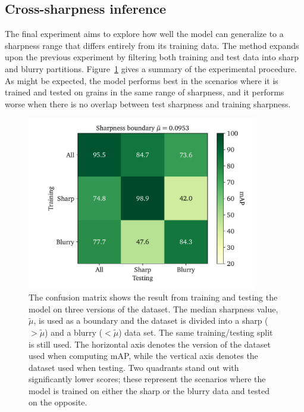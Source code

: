 \subsection{Cross-sharpness inference}
The final experiment aims to explore how well the model can generalize to a sharpness range that differs entirely from its training data. The method expands upon the previous experiment by filtering both training and test data into sharp and blurry partitions.
Figure~\ref{fig:results-sharpness-inference} gives a summary of the experimental procedure.
As might be expected, the model performs best in the scenarios where it is trained and tested on grains in the same range of sharpness, and it performs worse when there is no overlap between test sharpness and training sharpness.

\begin{figure}[htbp]
  \centering
  \includegraphics[width=0.9\textwidth]{figs/results/sharpness/confustion_balanced_test_map.pdf}
  \caption[mAP across sharpness boundary]{%
The confusion matrix shows the result from training and testing the model on three versions of the dataset.
The median sharpness value, \(\tilde{\mu}\), is used as a boundary and the dataset is divided into a sharp (\(>\tilde{\mu}\)) and a blurry (\(<\tilde{\mu}\)) data set.
The same training/testing split is still used.
The horizontal axis denotes the version of the dataset used when computing mAP, while the vertical axis denotes the dataset used when testing.
Two quadrants stand out with significantly lower scores; these represent the scenarios where the model is trained on either the sharp or the blurry data and tested on the opposite.
  }\label{fig:results-sharpness-inference}
\end{figure}

